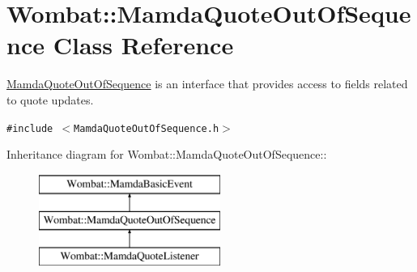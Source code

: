 \hypertarget{classWombat_1_1MamdaQuoteOutOfSequence}{
\section{Wombat::Mamda\-Quote\-Out\-Of\-Sequence Class Reference}
\label{classWombat_1_1MamdaQuoteOutOfSequence}
}
\hyperlink{classWombat_1_1MamdaQuoteOutOfSequence}{Mamda\-Quote\-Out\-Of\-Sequence} is an interface that provides access to fields related to quote updates.  


{\tt \#include $<$Mamda\-Quote\-Out\-Of\-Sequence.h$>$}

Inheritance diagram for Wombat::Mamda\-Quote\-Out\-Of\-Sequence::\begin{figure}[H]
\begin{center}
\leavevmode
\includegraphics[height=3cm]{classWombat_1_1MamdaQuoteOutOfSequence}
\end{center}
\end{figure}
